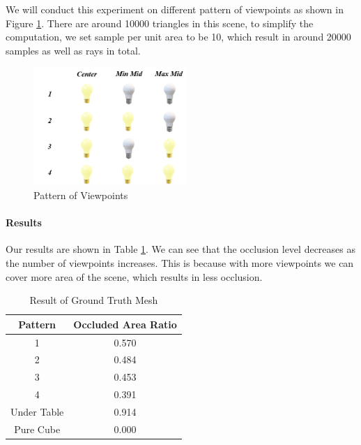 \documentclass[11pt, a4paper,oneside,chapterprefix=false]{scrbook}
\begin{document}
\vspace{10pt}

We will conduct this experiment on different pattern of viewpoints as shown in Figure \ref{fig:pattern of viewpoints}. 
There are around 10000 triangles in this scene, to simplify the computation, we set sample per unit area to be 10, which result in around 20000 samples as well as rays in total. 

\begin{figure}[H]
    \centering
    \includegraphics*[width=0.52\textwidth]{figures/pattern of viewpoints.png}
    \caption{Pattern of Viewpoints}
    \label{fig:pattern of viewpoints}
\end{figure}

\vspace{20pt}

\paragraph{Results}

Our results are shown in Table \ref{tab:result of each experiment}. We can see that the occlusion level decreases as the number of viewpoints increases. This is because with more viewpoints we can cover more area of the scene, which results in less occlusion.

\vspace{10pt}

\begin{table}[h]
    \centering
    \begin{tabular}{|c|c|}
        \hline
        \textbf{Pattern} & \textbf{Occluded Area Ratio} \\
        \hline
        1 & 0.570 \\
        2 & 0.484 \\
		3 & 0.453 \\
		4 & 0.391 \\
        Under Table & 0.914 \\
        Pure Cube & 0.000 \\

        \hline
    \end{tabular}
    \caption{Result of Ground Truth Mesh}
    \label{tab:result of each experiment}
\end{table}
\end{document}
